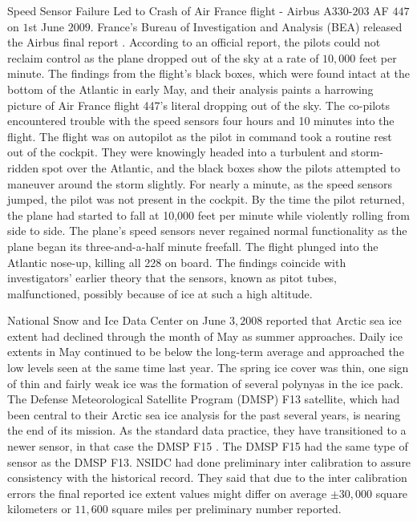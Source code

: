 	Speed Sensor Failure Led to Crash of Air France flight - Airbus A$330$-$203$ AF $447$ on $1$st June $2009$.
	France's Bureau of Investigation and Analysis (BEA) released the Airbus final report \cite{final-report}.
	According to an official report, the pilots could not reclaim control as the plane dropped out of the sky at a rate of $10,000$ feet per minute.
	The findings from the flight's black boxes, which were found intact at the bottom of the Atlantic in early May, and their analysis paints a harrowing picture of Air France flight 447's literal dropping out of the sky.
	The co-pilots encountered trouble with the speed sensors four hours and 10 minutes into the flight. 
	The flight was on autopilot as the pilot in command took a routine rest out of the cockpit. 
	They were knowingly headed into a turbulent and storm-ridden spot over the Atlantic, and the black boxes show the pilots attempted to maneuver around the storm slightly.
	For nearly a minute, as the speed sensors jumped, the pilot was not present in the cockpit. 
	By the time the pilot returned, the plane had started to fall at 10,000 feet per minute while violently rolling from side to side.
	The plane's speed sensors never regained normal functionality as the plane began its three-and-a-half minute freefall.
	The flight plunged into the Atlantic nose-up, killing all 228 on board.
	The findings coincide with investigators' earlier theory that the sensors, known as pitot tubes, malfunctioned, possibly because of ice at such a high altitude.

	National Snow and Ice Data Center on June $3, 2008$ \cite{nsidc} reported that Arctic sea ice extent had declined through the month of May as summer approaches. 
	Daily ice extents in May continued to be below the long-term average and approached the low levels seen at the same time last year.
	The spring ice cover was thin, one sign of thin and fairly weak ice was the formation of several polynyas in the ice pack.
	The Defense Meteorological Satellite Program (DMSP) F13 \cite{dmsp-f13} satellite, which had been central to their Arctic sea ice analysis for the past several years, is nearing the end of its mission.
	As the standard data practice, they have transitioned to a newer sensor, in that case the DMSP F15 \cite{dmsp-f15}. 
	The DMSP F15 had the same type of sensor as the DMSP F13. 
	NSIDC had done preliminary inter calibration to assure consistency with the historical record. 
	They said that due to the inter calibration errors the final reported ice extent values might differ on average $\pm 30,000$ square kilometers or $11,600$ square miles per preliminary number reported.

